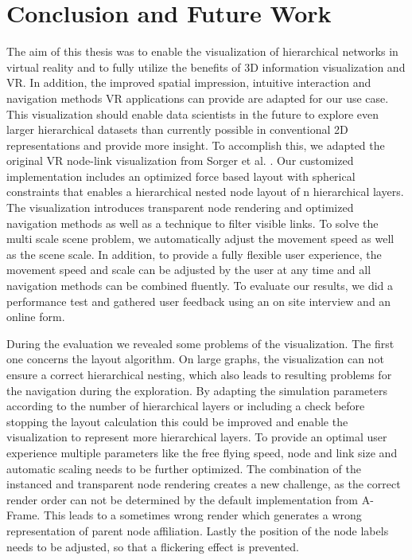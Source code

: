 \chapter{Conclusion and Future Work}
\label{chap:conclusion}

The aim of this thesis was to enable the visualization of hierarchical networks in virtual reality and to fully utilize the benefits of 3D information visualization and VR. In addition, the improved spatial impression, intuitive interaction and navigation methods VR applications can provide are adapted for our use case. 
This visualization should enable data scientists in the future to explore even larger hierarchical datasets than currently possible in conventional 2D representations and provide more insight.
To accomplish this, we adapted the original VR node-link visualization from Sorger et al. \cite{sorger_immersive_2019}. 
Our customized implementation includes an optimized force based layout with spherical constraints that enables a hierarchical nested node layout of n hierarchical layers.
The visualization introduces transparent node rendering and optimized navigation methods as well as a technique to filter visible links. 
To solve the multi scale scene problem, we automatically adjust the movement speed as well as the scene scale.
In addition, to provide a fully flexible user experience, the movement speed and scale can be adjusted by the user at any time and all navigation methods can be combined fluently.
To evaluate our results, we did a performance test and gathered user feedback using an on site interview and an online form.

During the evaluation we revealed some problems of the visualization. 
The first one concerns the layout algorithm. On large graphs, the visualization can not ensure a correct hierarchical nesting, which also leads to resulting problems for the navigation during the exploration. By adapting the simulation parameters according to the number of hierarchical layers or including a check before stopping the layout calculation this could be improved and enable the visualization to represent more hierarchical layers.
To provide an optimal user experience multiple parameters like the free flying speed, node and link size and automatic scaling needs to be further optimized.
The combination of the instanced and transparent node rendering creates a new challenge, as the correct render order can not be determined by the default implementation from A-Frame. This leads to a sometimes wrong render which generates a wrong representation of parent node affiliation.
Lastly the position of the node labels needs to be adjusted, so that a flickering effect is prevented.


